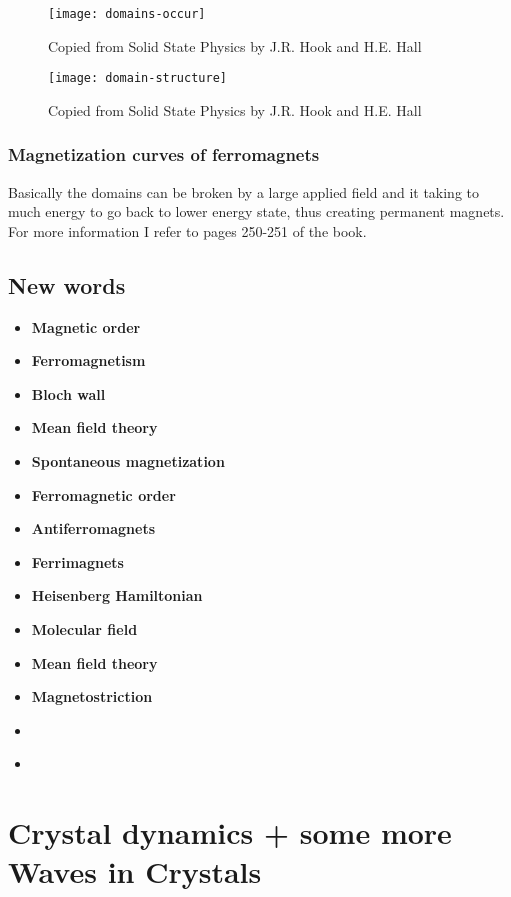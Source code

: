 \documentclass[11pt]{article}
\begin{document}
\begin{figure}[!h]
	\centering
	\texttt{[image: domains-occur]}
	\caption{Copied from Solid State Physics by J.R. Hook and H.E. Hall}
	\label{fig:domains-occur}
\end{figure}

\begin{figure}[!h]
	\centering
	\texttt{[image: domain-structure]}
	\caption{Copied from Solid State Physics by J.R. Hook and H.E. Hall}
	\label{fig:domain-structure}
\end{figure}

\subsubsection{Magnetization curves of ferromagnets}
Basically the domains can be broken by a large applied field and it taking to much energy to go back to lower energy state, thus creating permanent magnets. For more information I refer to pages 250-251 of the book.


\newpage
\subsection{New words}
\begin{itemize}
	\item \textbf{Magnetic order}
	\item \textbf{Ferromagnetism}
	\item \textbf{Bloch wall}
	\item \textbf{Mean field theory}
	\item \textbf{Spontaneous magnetization}
	\item \textbf{Ferromagnetic order}
	\item \textbf{Antiferromagnets}
	\item \textbf{Ferrimagnets}
	\item \textbf{Heisenberg Hamiltonian}
	\item \textbf{Molecular field}
	\item \textbf{Mean field theory}
	\item \textbf{Magnetostriction}
	\item \textbf{}
	\item \textbf{}
\end{itemize}
\newpage

\section{Crystal dynamics + some more Waves in Crystals}
\end{document}
